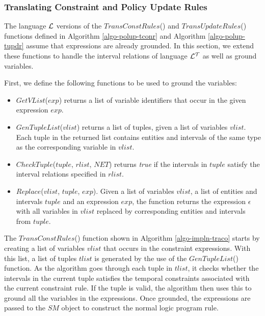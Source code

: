 \documentclass[11pt]{report}
\begin{document}
        \subsubsection{Translating Constraint and Policy Update Rules}

          The language ${\cal L}$ versions of the $TransConstRules$() and
          $TransUpdateRules$() functions defined in Algorithm
          \ref{algo-polup-tconr} and Algorithm \ref{algo-polup-tupdr} assume
          that expressions are already grounded. In this section, we extend
          these functions to handle the interval relations of language
          ${\cal L^T}$ as well as ground variables.

          First, we define the following functions to be used to ground the
          variables:

          \begin{itemize}
            \item
              $GetVList$($exp$) returns a list of variable identifiers
              that occur in the given expression $exp$.
         
            \item
              $GenTupleList$($vlist$) returns a list of tuples, given a list of
              variables $vlist$. Each tuple in the returned list contains
              entities and intervals of the same type as the corresponding
              variable in $vlist$.
         
            \item
              $CheckTuple$($tuple$, $rlist$, $NET$) returns {\em true} if the
              intervals in $tuple$ satisfy the interval relations specified in
              $rlist$.
         
            \item
              $Replace$($vlist$, $tuple$, $exp$). Given a list of
              variables $vlist$, a list of entities and intervals $tuple$ and
              an expression $exp$, the function returns the expression
              $\epsilon$ with all variables in $vlist$ replaced by
              corresponding entities and intervals from $tuple$.
          \end{itemize}

          The $TransConstRules$() function shown in Algorithm
          \ref{algo-impln-traco} starts by creating a list of variables
          $vlist$ that occurs in the constraint expressions. With this list,
          a list of tuples $tlist$ is generated by the use of the
          $GenTupleList$() function. As the algorithm goes through each tuple
          in $tlist$, it checks whether the intervals in the current tuple
          satisfies the temporal constraints associated with the current
          constraint rule. If the tuple is valid, the algorithm then uses
          this to ground all the variables in the expressions. Once grounded,
          the expressions are passed to the $SM$ object to construct the
          normal logic program rule.
\end{document}
